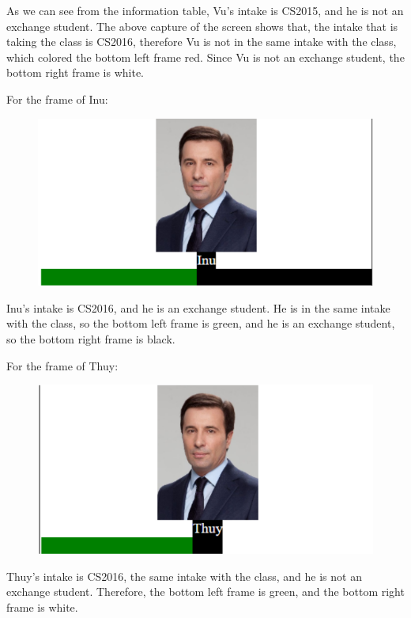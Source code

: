 \documentclass[a4paper, 11pt,openany]{book} %
\begin{document}
As we can see from the information table, Vu’s intake is CS2015, and he is not an exchange student. The above capture of the screen shows that, the intake that is taking the class is CS2016, therefore Vu is not in the same intake with the class, which colored the bottom left frame red. Since Vu is not an exchange student, the bottom right frame is white.\par 
For the frame of Inu:
\begin{figure}[H]
    \centering
    \includegraphics[width=\textwidth,height=\textheight,keepaspectratio]{images/10.png}
\end{figure}
Inu’s intake is CS2016, and he is an exchange student. He is in the same intake with the class, so the  bottom left frame is green, and he is an exchange student, so the bottom right frame is black.\par 
For the frame of Thuy:
\begin{figure}[H]
    \centering
    \includegraphics[width=\textwidth,height=\textheight,keepaspectratio]{images/11.png}
\end{figure}
Thuy’s intake is CS2016, the same intake with the class, and he is not an exchange student. Therefore, the bottom left frame is green, and the bottom right frame is white.\par 
\end{document}
